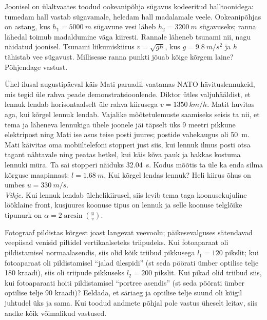 \documentclass[10pt, twoside]{article}
\begin{document}
{Joonisel on ülaltvaates toodud ookeanipõhja sügavus kodeeritud halltoonidega: tumedam hall vastab sügavamale, heledam hall madalamale veele. Ookeanipõhjas on astang, kus $h_1 = \SI{5000}{m}$ sügavune vesi läheb $h_2 = \SI{3200}{m}$ sügavuseks; ranna lähedal toimub madaldumine väga kiiresti. Rannale läheneb tsunami nii, nagu näidatud joonisel. Tsunami liikumiskiirus $v = \sqrt{gh}$, kus $g = \SI{9,8}{m/s^2}$ ja $h$ tähistab vee sügavust. Millisesse ranna punkti jõuab kõige kõrgem laine? Põhjendage vastust.
\probend
\bigskip


Ühel ilusal augustipäeval käis Mati paraadil vaatamas NATO hävituslennukeid, mis
tegid üle rahva peade demonstratsioonlende. Diktor ütles valjuhääldist, et lennuk
lendab horisontaalselt üle rahva kiirusega $v=\SI{1350}{km/h}$. Matit huvitas aga, kui
kõrgel lennuk lendab. Vajalike mõõtetulemuste saamiseks seisis ta nii, et tema
ja läheneva lennukiga ühele joonele jäi täpselt üks 9 meetri pikkune elektripost
ning Mati ise asus teise posti juures; postide vahekaugus oli \SI{50}{m}. Mati käivitas oma
mobiiltelefoni stopperi just siis, kui lennuk ilmus posti otsa tagant nähtavale ning 
peatas hetkel, kui käis kõva pauk ja hakkas kostuma lennuki müra. Ta sai
stopperi näiduks \SI{32,04}{s}. Kodus
mõõtis ta üle ka enda silma kõrguse maapinnast: $l=\SI{1,68}{m}$.
Kui kõrgel lendas lennuk? Heli kiirus õhus on umbes
$u=\SI{330}{m/s}$.\\ 
\textit{Vihje.} Kui lennuk lendab
ülehelikiirusel, siis levib tema taga
koonusekujuline lööklaine front, kusjuures koonuse tipus on lennuk ja selle
koonuse telglõike
tipunurk on $\alpha=2\arcsin\left(\frac{u}{v}\right)$.
\probend
\bigskip


Fotograaf pildistas kõrgest joast langevat veevoolu; päikesevalguses sätendavad veepiisad venisid piltidel vertikaalseteks triipudeks.
Kui fotoaparaat oli pildistamisel normaalasendis, siis olid kõik triibud pikkusega $l_1 = \num{120}$ pikslit; kui fotoaparaat oli pildistamisel \enquote{jalad ülespidi} (st seda
pöörati ümber optilise telje \num{180} kraadi), siis oli triipude pikkuseks $l_2 = \num{200}$
pikslit. Kui pikad olid triibud siis, kui fotoaparaati hoiti pildistamisel \enquote{portree
asendis} (st seda pöörati ümber optilise telje \num{90} kraadi)? Eeldada, et säriaeg
ja optilise telje suund oli kõigil juhtudel üks ja sama. Kui toodud andmete
põhjal pole vastus üheselt leitav, siis andke kõik võimalikud vastused.

}
\end{document}
